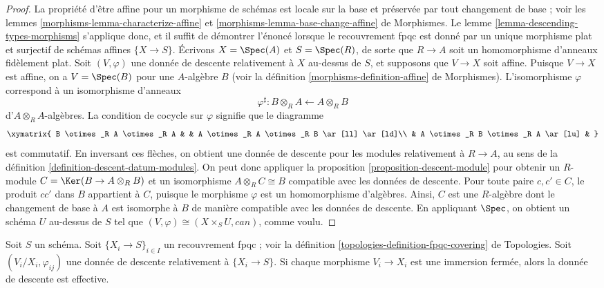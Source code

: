 \begin{proof}
La propriété d'être affine pour un morphisme de schémas est locale sur la base
et préservée par tout changement de base ; voir les lemmes
\ref{morphisms-lemma-characterize-affine} et
\ref{morphisms-lemma-base-change-affine} de Morphismes. Le
lemme \ref{lemma-descending-types-morphisms} s'applique donc, et il suffit de
démontrer l'énoncé lorsque le recouvrement fpqc est donné par un unique
morphisme plat et surjectif de schémas affines $\{X \to S\}$. Écrivons
$X = \Spec(A)$ et $S = \Spec(R)$, de sorte que $R \to A$ soit un
homomorphisme d'anneaux fidèlement plat. Soit $(V, \varphi)$ une donnée de
descente relativement à $X$ au-dessus de $S$, et supposons que $V \to X$ soit
affine. Puisque $V \to X$ est affine, on a $V = \Spec(B)$ pour une
$A$-algèbre $B$ (voir la
définition \ref{morphisms-definition-affine} de Morphismes). L'isomorphisme $\varphi$
correspond à un isomorphisme d'anneaux
$$
\varphi^\sharp :
B \otimes_R A \longleftarrow A \otimes_R B
$$
d'$A \otimes_R A$-algèbres. La condition de cocycle sur $\varphi$ signifie que
le diagramme
$$
\xymatrix{
B \otimes_R A \otimes_R A & &
A \otimes_R A \otimes_R B \ar[ll] \ar[ld]\\
& A \otimes_R B \otimes_R A \ar[lu] &
}
$$
est commutatif. En inversant ces flèches, on obtient une donnée de descente
pour les modules relativement à $R \to A$, au sens de la
définition \ref{definition-descent-datum-modules}. On peut donc appliquer la
proposition \ref{proposition-descent-module} pour obtenir un $R$-module
$C = \Ker(B \to A \otimes_R B)$ et un isomorphisme
$A \otimes_R C \cong B$ compatible avec les données de descente. Pour toute
paire $c, c' \in C$, le produit $cc'$ dans $B$ appartient à $C$, puisque le
morphisme $\varphi$ est un homomorphisme d'algèbres. Ainsi, $C$ est une
$R$-algèbre dont le changement de base à $A$ est isomorphe à $B$ de manière
compatible avec les données de descente. En appliquant $\Spec$, on obtient un
schéma $U$ au-dessus de $S$ tel que
$(V, \varphi) \cong (X \times_S U, can)$, comme voulu.
\end{proof}

\begin{lemma}
\label{lemma-closed-immersion}
Soit $S$ un schéma. Soit $\{X_i \to S\}_{i\in I}$ un recouvrement fpqc ; voir
la définition \ref{topologies-definition-fpqc-covering} de Topologies. Soit
$(V_i/X_i, \varphi_{ij})$ une donnée de descente relativement à
$\{X_i \to S\}$. Si chaque morphisme $V_i \to X_i$ est une immersion fermée,
alors la donnée de descente est effective.
\end{lemma}

